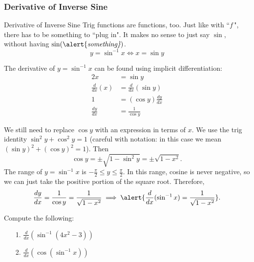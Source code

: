 \documentclass[cal1spr16Lectures.tex]{subfiles}
\begin{document}
\subsubsection{Derivative of Inverse Sine}

\begin{frame}{\small Derivative of Inverse Sine}
Trig functions are functions, too.  Just like with ``$f\,$", there has to be something to ``plug in".  It makes no sense to just say $\sin$, without having $\sin(\text{\alert{\it something}})$.
\[y=\sin^{-1}x \Longleftrightarrow x=\sin y\]  
\end{frame}

\begin{frame}\footnotesize
The derivative of $y=\sin^{-1}x$ can be found using implicit differentiation: 
\begin{alignat*}{2}
x &= \sin y \\
\frac{d}{dx}(x) &= \frac{d}{dx}(\sin y) \\
1 &= (\cos y) \frac{dy}{dx} \\
\frac{dy}{dx} &= \frac{1}{\cos y}
\end{alignat*}
\end{frame}

\begin{frame}\footnotesize
We still need to replace $\cos y$ with an expression in terms of $x$.  We use the trig identity $\sin^2 y + \cos^2 y = 1$ (careful with notation: in this case we mean $\left(\sin y\right)^2+\left(\cos y\right)^2=1$).  Then 
\[\cos y= \pm \sqrt{1-\sin^2 y}=\pm\sqrt{1-x^2}.\]
The range of $y=\sin^{-1}x$ is $-\textstyle\frac{\pi}{2} \leq y \leq \frac{\pi}{2}$.  In this range, cosine is never negative, so we can just take the positive portion of the square root.
Therefore,
\[\frac{dy}{dx}=\frac{1}{\cos y}=\frac{1}{\sqrt{1-x^2}} \implies \alert{\frac{d}{dx}(\sin^{-1}x)=\frac{1}{\sqrt{1-x^2}}}.\]
\end{frame}

\begin{frame}{}
\begin{exe} Compute the following:
\begin{itemize}
\item[1.] $\frac{d}{dx} \left( \sin^{-1}(4x^2-3) \right)$
\item[2.] $\frac{d}{dx} \left( \cos(\sin^{-1}x) \right)$
\end{itemize}
\end{exe}
\end{frame}
\end{document}
